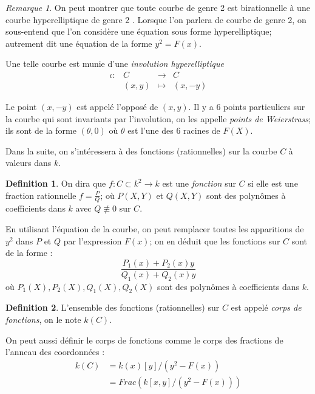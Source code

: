 \documentclass[a4paper,12pt]{article}
\theoremstyle{definition}
\newtheorem{definition}{Definition}[section]
\theoremstyle{remark}
\newtheorem{remarque}{Remarque}
\numberwithin{equation}{section}
\begin{document}
\begin{remarque}
On peut montrer que toute courbe de genre 2 est birationnelle à une courbe hyperelliptique de genre 2 \citep{cassels-Flynn}. Lorsque l'on parlera de courbe de genre 2, on sous-entend que l'on considère une équation sous forme hyperelliptique; autrement dit une équation de la forme $y^2 = F(x)$.
\end{remarque}

Une telle courbe est munie d'une \emph{involution hyperelliptique}
\begin{equation*}
\begin{array}{lrcl}
\iota :&C & \longrightarrow & C \\
& (x,y) & \longmapsto & (x,-y)
\end{array}
\end{equation*}

Le point $(x,-y)$ est appelé l'opposé de $(x,y)$. Il y a 6 points particuliers sur la courbe qui sont invariants par l'involution, on les appelle \emph{points de Weierstrass}; ils sont de la forme $(\theta,0)$ où $\theta$ est l'une des 6 racines de $F(X)$.

Dans la suite, on s'intéressera à des fonctions (rationnelles) sur la courbe $C$ à valeurs dans $k$.
\begin{definition}
On dira que $f : C \subset k^2 \longrightarrow k$ est une \emph{fonction} sur $C$ si elle est une fraction rationnelle $f = \frac{P}{Q}$; où $P(X,Y)$ et $Q(X,Y)$ sont des polynômes à coefficients dans $k$ avec $Q \not\equiv 0$ sur $C$.
\end{definition}

En utilisant l'équation de la courbe, on peut remplacer toutes les apparitions de $y^2$ dans $P$ et $Q$ par l'expression $F(x)$; on en déduit que les fonctions sur $C$ sont de la forme :
$$\frac{P_1(x) + P_2(x)y}{Q_1(x) + Q_2(x)y}$$
où $P_1(X),P_2(X),Q_1(X),Q_2(X)$ sont des polynômes à coefficients dans $k$.

\begin{definition}
L'ensemble des fonctions (rationnelles) sur $C$ est appelé \emph{corps de fonctions}, on le note $k(C)$.
\end{definition}

On peut aussi définir le corps de fonctions comme le corps des fractions de l'anneau des coordonnées :
\begin{align*}
k(C) &= k(x)[y]/(y^2-F(x)) \\
  &= Frac(k[x,y]/(y^2-F(x)))
\end{align*}
\end{document}
